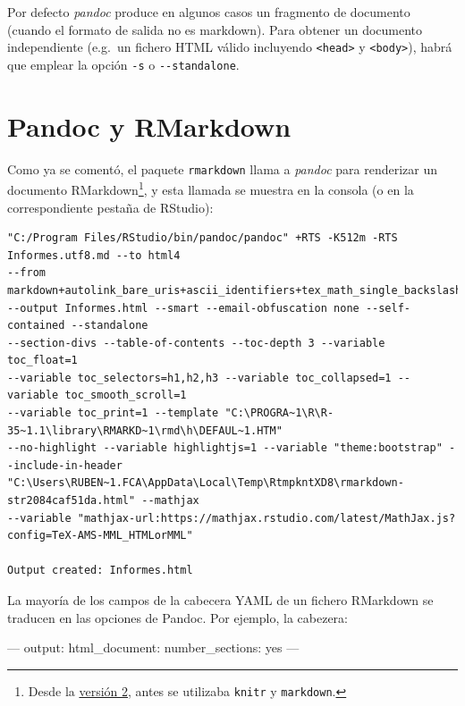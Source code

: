 \documentclass[]{book}
\newenvironment{Shaded}{\begin{snugshade}}{\end{snugshade}}
\newcommand{\OtherTok}[1]{\textcolor[rgb]{0.56,0.35,0.01}{#1}}
\newcommand{\FunctionTok}[1]{\textcolor[rgb]{0.00,0.00,0.00}{#1}}
\newcommand{\AttributeTok}[1]{\textcolor[rgb]{0.77,0.63,0.00}{#1}}
\let\rmarkdownfootnote\footnote%
\def\footnote{\protect\rmarkdownfootnote}
\theoremstyle{definition}
\theoremstyle{definition}
\theoremstyle{definition}
\theoremstyle{remark}
\begin{document}
Por defecto \emph{pandoc} produce en algunos casos un fragmento de
documento (cuando el formato de salida no es markdown). Para obtener un
documento independiente (e.g.~un fichero HTML válido incluyendo
\texttt{\textless{}head\textgreater{}} y
\texttt{\textless{}body\textgreater{}}), habrá que emplear la opción
\texttt{-s} o \texttt{-\/-standalone}.

\section{Pandoc y RMarkdown}\label{pandoc-y-rmarkdown}

Como ya se comentó, el paquete \texttt{rmarkdown} llama a \emph{pandoc}
para renderizar un documento RMarkdown\footnote{Desde la
  \href{https://blog.rstudio.org/2014/06/18/r-markdown-v2/}{versión 2},
  antes se utilizaba \texttt{knitr} y \texttt{markdown}.}, y esta
llamada se muestra en la consola (o en la correspondiente pestaña de
RStudio):

\begin{verbatim}
"C:/Program Files/RStudio/bin/pandoc/pandoc" +RTS -K512m -RTS Informes.utf8.md --to html4 
--from markdown+autolink_bare_uris+ascii_identifiers+tex_math_single_backslash 
--output Informes.html --smart --email-obfuscation none --self-contained --standalone 
--section-divs --table-of-contents --toc-depth 3 --variable toc_float=1 
--variable toc_selectors=h1,h2,h3 --variable toc_collapsed=1 --variable toc_smooth_scroll=1 
--variable toc_print=1 --template "C:\PROGRA~1\R\R-35~1.1\library\RMARKD~1\rmd\h\DEFAUL~1.HTM"
--no-highlight --variable highlightjs=1 --variable "theme:bootstrap" --include-in-header
"C:\Users\RUBEN~1.FCA\AppData\Local\Temp\RtmpkntXD8\rmarkdown-str2084caf51da.html" --mathjax 
--variable "mathjax-url:https://mathjax.rstudio.com/latest/MathJax.js?config=TeX-AMS-MML_HTMLorMML"

Output created: Informes.html
\end{verbatim}

La mayoría de los campos de la cabecera YAML de un fichero RMarkdown se
traducen en las opciones de Pandoc. Por ejemplo, la cabezera:

\begin{Shaded}
\begin{Highlighting}[]
\OtherTok{---}
\FunctionTok{output:}
  \FunctionTok{html_document:}
    \FunctionTok{number_sections:}\AttributeTok{ yes      }
\OtherTok{---}
\end{Highlighting}
\end{Shaded}
\end{document}
